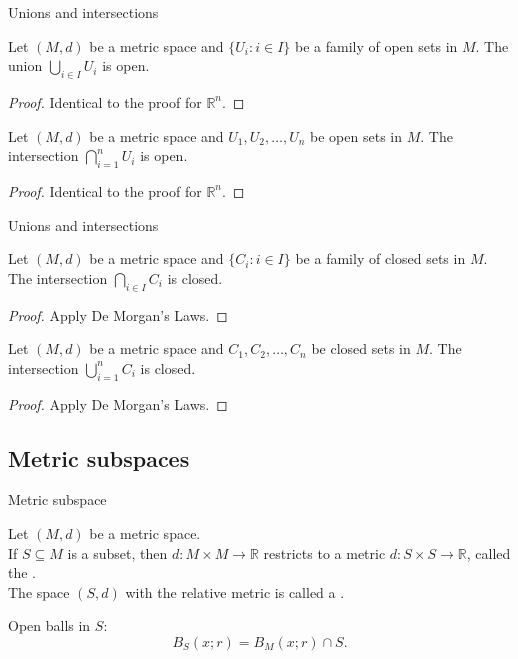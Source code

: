 \documentclass{beamer}
\begin{document}
\begin{frame}{Unions and intersections}
\pause
\begin{thm}
Let $(M,d)$ be a metric space and  $\{U_i: i\in I\}$ be a family of open sets in $M$.
The union $\bigcup_{i\in I} U_i$ is open.
\end{thm}
\pause
\begin{proof}
Identical to the proof for $\mathbb{R}^n$.
\end{proof}
\pause
\begin{thm}
Let $(M,d)$ be a metric space and $U_1,U_2,\dots, U_n$ be open sets in $M$.
The intersection $\bigcap_{i=1}^n U_i$ is open.
\end{thm}
\pause
\begin{proof}
Identical to the proof for $\mathbb{R}^n$.
\end{proof}
\end{frame}

\begin{frame}{Unions and intersections}
\pause
\begin{thm}
Let $(M,d)$ be a metric space and  $\{C_i: i\in I\}$ be a family of closed sets in $M$.
The intersection $\bigcap_{i\in I} C_i$ is closed.
\end{thm}
\pause
\begin{proof}
Apply De Morgan's Laws.
\end{proof}
\pause
\begin{thm}
Let $(M,d)$ be a metric space and $C_1,C_2,\dots, C_n$ be closed sets in $M$.
The intersection $\bigcup_{i=1}^n C_i$ is closed.
\end{thm}
\pause
\begin{proof}
Apply De Morgan's Laws.
\end{proof}
\end{frame}

\subsection{Metric subspaces}

\begin{frame}{Metric subspace}
\begin{defn}
Let $(M,d)$ be a metric space.\\
\pause
If $S\subseteq M$ is a subset, then $d: M\times M\rightarrow \mathbb{R}$ restricts to a metric $d: S\times S\rightarrow \mathbb{R}$, called the .\\
\pause
The space $(S,d)$ with the relative metric is called a .
\end{defn}
\pause
Open balls in $S$:
$$B_S(x; r) = B_M(x; r) \cap S.$$
\end{frame}
\end{document}
